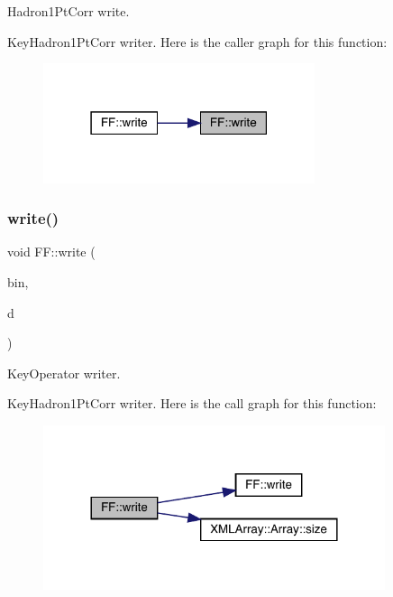 Hadron1\+Pt\+Corr write. 

Key\+Hadron1\+Pt\+Corr writer. Here is the caller graph for this function\+:
\nopagebreak
\begin{figure}[H]
\begin{center}
\leavevmode
\includegraphics[width=226pt]{d5/da6/namespaceFF_a78fdf587c961ada1987ee8f443e3d961_icgraph}
\end{center}
\end{figure}
\mbox{\label{namespaceFF_a5c3e38934ee51ae23bc9d39dca34acc1}} 
\subsubsection{\texorpdfstring{write()}{write()}\hspace{0.1cm}{\footnotesize\ttfamily [9/13]}}
{\footnotesize\ttfamily void F\+F\+::write (\begin{DoxyParamCaption}\item[{\mbox{\hyperlink{classADATIO_1_1BinaryWriter}{Binary\+Writer}} \&}]{bin,  }\item[{const \mbox{\hyperlink{structFF_1_1DiscoKeyOperator__t}{Disco\+Key\+Operator\+\_\+t}} \&}]{d }\end{DoxyParamCaption})}



Key\+Operator writer. 

Key\+Hadron1\+Pt\+Corr writer. Here is the call graph for this function\+:
\nopagebreak
\begin{figure}[H]
\begin{center}
\leavevmode
\includegraphics[width=284pt]{d5/da6/namespaceFF_a5c3e38934ee51ae23bc9d39dca34acc1_cgraph}
\end{center}
\end{figure}
\mbox{\label{namespaceFF_a9e6eed897710dbad982d5a699a70f857}} 
